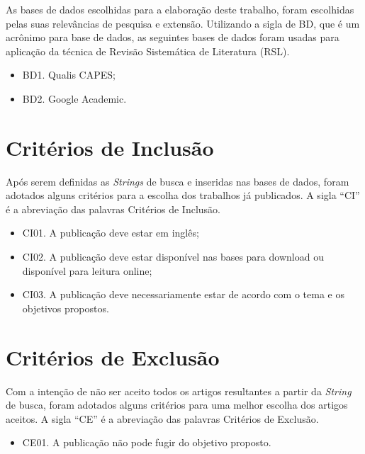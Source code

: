 As bases de dados escolhidas para a elaboração deste trabalho, foram escolhidas pelas suas relevâncias de pesquisa e extensão. Utilizando a sigla de BD, que é um acrônimo para base de dados, as seguintes bases de dados foram usadas para aplicação da técnica de Revisão Sistemática de Literatura (RSL).

\begin{itemize}
    \item BD1. Qualis CAPES;
    \item BD2. Google Academic.
\end{itemize} 

\section{Critérios de Inclusão}

Após serem definidas as \textit{Strings} de busca e inseridas nas bases de dados, foram adotados alguns critérios para a escolha dos trabalhos já publicados. A sigla “CI” é a abreviação das palavras Critérios de Inclusão.

\begin{itemize}
    \item CI01. A publicação deve estar em inglês;
    \item CI02. A publicação deve estar disponível nas bases para download ou disponível para leitura online;
    \item CI03. A publicação deve necessariamente estar de acordo com o tema e os objetivos propostos.
\end{itemize}

\section{Critérios de Exclusão}

Com a intenção de não ser aceito todos os artigos resultantes a partir da \textit{String} de busca, foram adotados alguns critérios para uma melhor escolha dos artigos aceitos. A sigla “CE” é a abreviação das palavras Critérios de Exclusão. 

\begin{itemize}
    \item CE01. A publicação não pode fugir do objetivo proposto.
\end{itemize}
